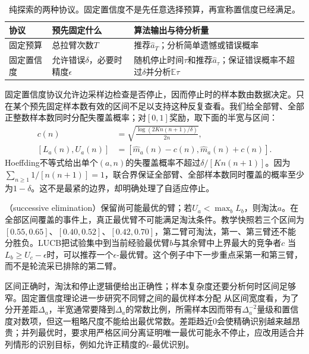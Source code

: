 \begin{table}[htbp]
  \centering
  \small
  \begin{tabularx}{\linewidth}{>{\raggedright\arraybackslash}p{22mm} >{\raggedright\arraybackslash}X >{\raggedright\arraybackslash}X}
    \toprule
    协议 & 预先固定什么 & 算法输出与待分析量 \\
    \midrule
    固定预算 & 总拉臂次数$T$ & 推荐$\widehat a_T$；分析简单遗憾或错误概率 \\
    固定置信度 & 允许错误$\delta$，必要时精度$\epsilon$ & 随机停止时间$\tau$和推荐$\widehat a_\tau$；保证错误概率不超过$\delta$并分析$\mathbb E\tau$ \\
    \bottomrule
  \end{tabularx}
  \caption{纯探索的两种协议。固定置信度不是先任意选择预算，再宣称置信度已经满足。}
  \label{tab:rl-learning-identification-protocols}
\end{table}

固定置信度协议允许边采样边检查是否停止，因而停止时的样本数由数据决定。只在某个预先固定样本数有效的区间不足以支持这种反复查看。我们给全部臂、全部正整数样本数同时分配失覆盖概率；对$[0,1]$奖励，取下面的半宽与区间：
\[
  \begin{aligned}
    c(n)&=\sqrt{\frac{\log(2K n(n+1)/\delta)}{2n}},\\
    [L_a(n),U_a(n)]&=[\widehat m_a(n)-c(n),\widehat m_a(n)+c(n)].
  \end{aligned}
\]
Hoeffding不等式给出单个$(a,n)$的失覆盖概率不超过$\delta/[K n(n+1)]$。因为$\sum_{n\geq1}1/[n(n+1)]=1$，联合界保证全部臂、全部样本数同时覆盖的概率至少为$1-\delta$。这不是最紧的边界，却明确处理了自适应停止。

（successive elimination）保留尚可能最优的臂；若$U_a<\max_b L_b$，则淘汰$a$。在全部区间覆盖的事件上，真正最优臂不可能满足淘汰条件。教学快照若三个区间为$[0.55,0.65]$、$[0.40,0.52]$、$[0.42,0.70]$，第二臂可淘汰，第一、第三臂还不能分胜负。LUCB把试验集中到当前经验最优臂$b$与其余臂中上界最大的竞争者$c$
当$L_b\geq U_c-\epsilon$时，可以推荐一个$\epsilon$-最优臂。这个例子中下一步重点采第一和第三臂，而不是轮流采已排除的第二臂。

区间正确时，淘汰和停止逻辑便给出正确性；样本复杂度还要分析何时区间足够窄。固定置信度理论进一步研究不同臂之间的最优样本分配
从区间宽度看，为了分开差距$\Delta_a$，半宽通常要降到$\Delta_a$的常数比例，所需样本因而带有$\Delta_a^{-2}$量级和置信度对数项，但这一粗略尺度不能给出最优常数。差距趋近0会使精确识别越来越昂贵；并列最优时，要求用严格区间分离证明唯一最优可能永不停止，应改用适合并列情形的识别目标，例如允许正精度的$\epsilon$-最优识别。

